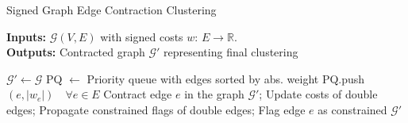 \documentclass{article}
\begin{document}
\begin{algorithm}[H]
  \caption{Signed Graph Edge Contraction Clustering}
   \hspace*{\algorithmicindent} \textbf{Inputs:} $\mathcal{G}(V,E)$ with signed costs $w:\,E\rightarrow\mathbb{R}$.  \\
  \hspace*{\algorithmicindent} \textbf{Outputs:} Contracted graph $\mathcal{G}'$ representing final clustering\\
  \hspace*{\algorithmicindent} 
  \begin{algorithmic}[1]


      \State $\mathcal{G}' \gets \mathcal{G}$ 
      \State PQ $\gets$ Priority queue with edges sorted by abs. weight
      \State PQ.push$(e, |w_e| ) \quad \forall e \in E $  
          \State Contract edge $e$ in the graph $\mathcal{G}'$;
          \State Update costs of double edges;
          \State Propagate constrained flags of double edges;
        \EndIf
          \State Flag edge $e$ as constrained
        \EndIf
      \EndFor
      \State
      \State
      \Return $\mathcal{G}'$


    \EndProcedure

  \end{algorithmic}
\end{algorithm}
\end{document}
